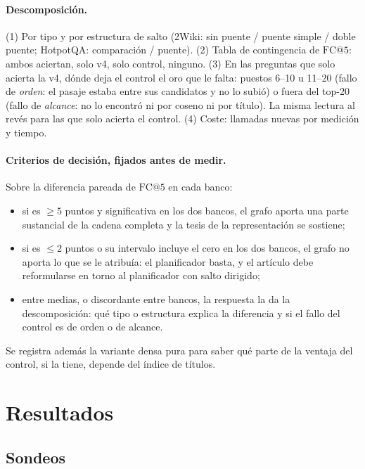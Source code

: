\documentclass[11pt,a4paper]{article}
\begin{document}
\paragraph{Descomposición.}
(1) Por tipo y por estructura de salto (2Wiki: sin puente / puente simple /
doble puente; HotpotQA: comparación / puente). (2) Tabla de contingencia
de $\mathrm{FC@}5$: ambos aciertan, solo v4, solo control, ninguno. (3) En
las preguntas que solo acierta la v4, dónde deja el control el oro que le
falta: puestos 6--10 u 11--20 (fallo de \emph{orden}: el pasaje estaba entre
sus candidatos y no lo subió) o fuera del top-20 (fallo de \emph{alcance}:
no lo encontró ni por coseno ni por título). La misma lectura al revés para
las que solo acierta el control. (4) Coste: llamadas nuevas por medición y
tiempo.

\paragraph{Criterios de decisión, fijados antes de medir.}
Sobre la diferencia pareada de $\mathrm{FC@}5$ en cada banco:
\begin{itemize}[leftmargin=1.6em, itemsep=1pt]
\item si es $\ge 5$ puntos y significativa en los dos bancos, el grafo
  aporta una parte sustancial de la cadena completa y la tesis de la
  representación se sostiene;
\item si es $\le 2$ puntos o su intervalo incluye el cero en los dos bancos,
  el grafo no aporta lo que se le atribuía: el planificador basta, y el
  artículo debe reformularse en torno al planificador con salto dirigido;
\item entre medias, o discordante entre bancos, la respuesta la da la
  descomposición: qué tipo o estructura explica la diferencia y si el fallo
  del control es de orden o de alcance.
\end{itemize}
Se registra además la variante densa pura para saber qué parte de la
ventaja del control, si la tiene, depende del índice de títulos.

\section{Resultados}
\label{sec:resultados}

\subsection{Sondeos}
\label{sec:sondeos}
\end{document}
